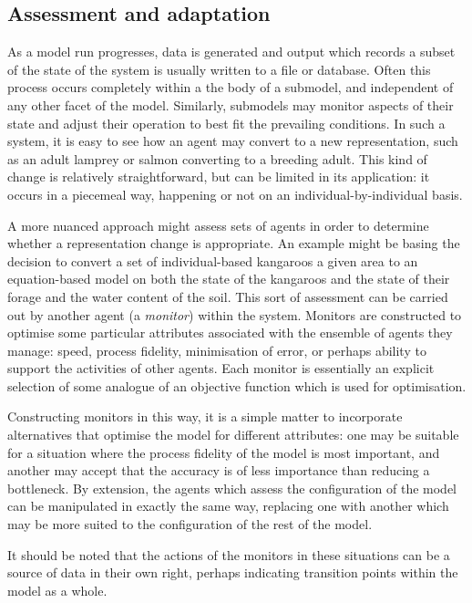\subsection{Assessment and adaptation}
As a model run progresses, data is generated and output which records
a subset of the state of the system is usually written to a file or
database.  Often this process occurs completely within a the body of a
submodel, and independent of any other facet of the model. Similarly,
submodels may monitor aspects of their state and adjust their
operation to best fit the prevailing conditions.  In such a system, it
is easy to see how an agent may convert to a new representation, such
as an adult lamprey or salmon converting to a breeding adult.  This
kind of change is relatively straightforward, but can be limited in
its application: it occurs in a piecemeal way, happening or not on an
individual-by-individual basis.

A more nuanced approach might assess sets of agents in order to
determine whether a representation change is appropriate. An example
might be basing the decision to convert a set of individual-based
kangaroos a given area to an equation-based model on both the state of
the kangaroos and the state of their forage and the water content of
the soil. This sort of assessment can be carried out by another agent
(a \textit{monitor}) within the system.  Monitors are constructed to
optimise some particular attributes associated with the ensemble of
agents they manage: speed, process fidelity, minimisation of error, or
perhaps ability to support the activities of other agents.  Each
monitor is essentially an explicit selection of some analogue of an
objective function which is used for optimisation.  

Constructing monitors in this way, it is a simple matter to
incorporate alternatives that optimise the model for different
attributes: one may be suitable for a situation where the process
fidelity of the model is most important, and another may accept that
the accuracy is of less importance than reducing a bottleneck.  By
extension, the agents which assess the configuration of the model can
be manipulated in exactly the same way, replacing one with another
which may be more suited to the configuration of the rest of the
model.

It should be noted that the actions of the monitors in these
situations can be a source of data in their own right, perhaps
indicating transition points within the model as a whole.


